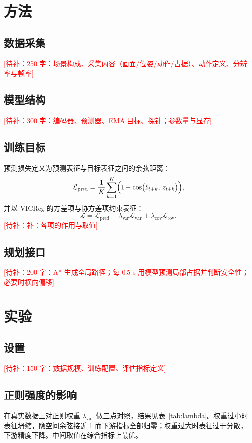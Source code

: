 \documentclass[12pt,a4paper]{ctexart}
\newcommand{\todo}[1]{\textcolor{red}{[待补：#1]}}
\begin{document}
\section{方法}

\subsection{数据采集}
\todo{250 字：场景构成、采集内容（画面/位姿/动作/占据）、动作定义、分辨率与帧率}

\subsection{模型结构}
\todo{300 字：编码器、预测器、EMA 目标、探针；参数量与显存}

\subsection{训练目标}
预测损失定义为预测表征与目标表征之间的余弦距离：
\begin{equation}
\mathcal{L}_{\text{pred}} = \frac{1}{K}\sum_{k=1}^{K}\Bigl(1-\cos\bigl(\hat{z}_{t+k},\,z_{t+k}\bigr)\Bigr),
\end{equation}
并以 VICReg 的方差项与协方差项约束表征：
\begin{equation}
\mathcal{L} = \mathcal{L}_{\text{pred}} + \lambda_{\text{var}}\mathcal{L}_{\text{var}} + \lambda_{\text{cov}}\mathcal{L}_{\text{cov}}.
\end{equation}
\todo{补：各项的作用与取值}

\subsection{规划接口}
\todo{200 字：A* 生成全局路径；每 0.5 s 用模型预测局部占据并判断安全性；必要时横向偏移}

\section{实验}

\subsection{设置}
\todo{150 字：数据规模、训练配置、评估指标定义}

\subsection{正则强度的影响}
在真实数据上对正则权重 $\lambda_{\text{var}}$ 做三点对照，结果见表~\ref{tab:lambda}。权重过小时表征坍缩，隐空间余弦接近 1 而下游指标全部归零；权重过大时表征过于分散，下游精度下降。中间取值在综合指标上最优。
\end{document}
